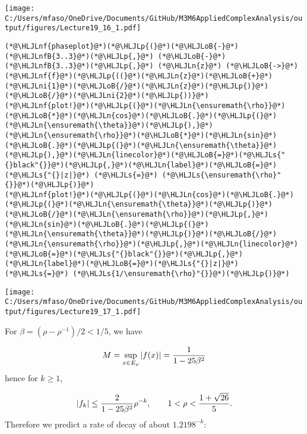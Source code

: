 \documentclass[12pt,landscape]{article}
\newcommand{\HLJLn}[1]{#1}
\newcommand{\HLJLnf}[1]{\textcolor[RGB]{66,102,213}{#1}}
\newcommand{\HLJLs}[1]{\textcolor[RGB]{201,61,57}{#1}}
\newcommand{\HLJLnfB}[1]{\textcolor[RGB]{59,151,46}{#1}}
\newcommand{\HLJLni}[1]{\textcolor[RGB]{59,151,46}{#1}}
\newcommand{\HLJLoB}[1]{\textcolor[RGB]{102,102,102}{\textbf{#1}}}
\newcommand{\HLJLp}[1]{#1}
\def\cent#1{\begin{center}#1\end{center} }
\begin{document}
{\texttt{[image: C:/Users/mfaso/OneDrive/Documents/GitHub/M3M6AppliedComplexAnalysis/output/figures/Lecture19\_16\_1.pdf]}
\newpage
\begin{lstlisting}
(*@\HLJLnf{phaseplot}@*)(*@\HLJLp{(}@*)(*@\HLJLoB{-}@*)(*@\HLJLnfB{3..3}@*)(*@\HLJLp{,}@*) (*@\HLJLoB{-}@*)(*@\HLJLnfB{3..3}@*)(*@\HLJLp{,}@*) (*@\HLJLn{z}@*) (*@\HLJLoB{->}@*) (*@\HLJLnf{f}@*)(*@\HLJLp{((}@*)(*@\HLJLn{z}@*)(*@\HLJLoB{+}@*)(*@\HLJLni{1}@*)(*@\HLJLoB{/}@*)(*@\HLJLn{z}@*)(*@\HLJLp{)}@*)(*@\HLJLoB{/}@*)(*@\HLJLni{2}@*)(*@\HLJLp{))}@*)
(*@\HLJLnf{plot!}@*)(*@\HLJLp{(}@*)(*@\HLJLn{\ensuremath{\rho}}@*)(*@\HLJLoB{*}@*)(*@\HLJLn{cos}@*)(*@\HLJLoB{.}@*)(*@\HLJLp{(}@*)(*@\HLJLn{\ensuremath{\theta}}@*)(*@\HLJLp{),}@*)(*@\HLJLn{\ensuremath{\rho}}@*)(*@\HLJLoB{*}@*)(*@\HLJLn{sin}@*)(*@\HLJLoB{.}@*)(*@\HLJLp{(}@*)(*@\HLJLn{\ensuremath{\theta}}@*)(*@\HLJLp{),}@*)(*@\HLJLn{linecolor}@*)(*@\HLJLoB{=}@*)(*@\HLJLs{"{}black"{}}@*)(*@\HLJLp{,}@*)(*@\HLJLn{label}@*)(*@\HLJLoB{=}@*)(*@\HLJLs{"{}|z|}@*) (*@\HLJLs{=}@*) (*@\HLJLs{\ensuremath{\rho}"{}}@*)(*@\HLJLp{)}@*)
(*@\HLJLnf{plot!}@*)(*@\HLJLp{(}@*)(*@\HLJLn{cos}@*)(*@\HLJLoB{.}@*)(*@\HLJLp{(}@*)(*@\HLJLn{\ensuremath{\theta}}@*)(*@\HLJLp{)}@*)(*@\HLJLoB{/}@*)(*@\HLJLn{\ensuremath{\rho}}@*)(*@\HLJLp{,}@*)(*@\HLJLn{sin}@*)(*@\HLJLoB{.}@*)(*@\HLJLp{(}@*)(*@\HLJLn{\ensuremath{\theta}}@*)(*@\HLJLp{)}@*)(*@\HLJLoB{/}@*)(*@\HLJLn{\ensuremath{\rho}}@*)(*@\HLJLp{,}@*)(*@\HLJLn{linecolor}@*)(*@\HLJLoB{=}@*)(*@\HLJLs{"{}black"{}}@*)(*@\HLJLp{,}@*)(*@\HLJLn{label}@*)(*@\HLJLoB{=}@*)(*@\HLJLs{"{}|z|}@*) (*@\HLJLs{=}@*) (*@\HLJLs{1/\ensuremath{\rho}"{}}@*)(*@\HLJLp{)}@*)
\end{lstlisting}

\cent{\texttt{[image: C:/Users/mfaso/OneDrive/Documents/GitHub/M3M6AppliedComplexAnalysis/output/figures/Lecture19\_17\_1.pdf]}}

For $\beta = (\rho - \rho^{-1})/2 < 1/5$, we have

\[
M =  \sup_{x \in  E_{\rho}} |f(x)| = {1 \over 1 - 25 \beta^2}
\]
hence for $k \geq 1$,

\[
\vert f_k \vert \leq {2 \over   1 - 25 \beta^2} \rho^{-k}, \qquad 1 < \rho <  { 1 + \sqrt{26} \over 5 }.
\]
Therefore we predict a rate of decay of about $1.2198^{-k}$:


}
\end{document}
